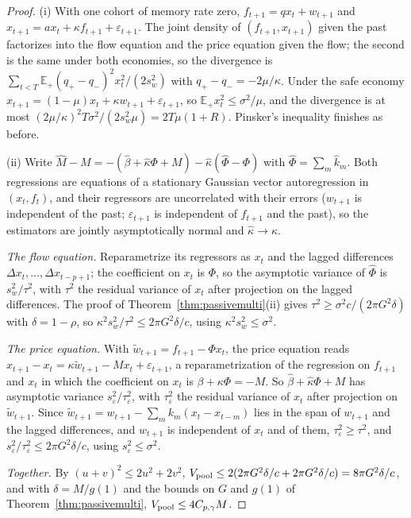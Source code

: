 \begin{proof}
(i) With one cohort of memory rate zero, $f_{t+1}=qx_t+w_{t+1}$ and $x_{t+1}=ax_t+\kappa f_{t+1}+\varepsilon_{t+1}$. The joint density of $(f_{t+1},x_{t+1})$ given the past factorizes into the flow equation and the price equation given the flow; the second is the same under both economies, so the divergence is $\sum_{t<T}\mathbb E_+(q_+-q_-)^2x_t^2/(2s_w^2)$ with $q_+-q_-=-2\mu/\kappa$. Under the safe economy $x_{t+1}=(1-\mu)x_t+\kappa w_{t+1}+\varepsilon_{t+1}$, so $\mathbb E_+x_t^2\le\sigma^2/\mu$, and the divergence is at most $(2\mu/\kappa)^2T\sigma^2/(2s_w^2\mu)=2T\mu(1+R)$. Pinsker's inequality finishes as before.

(ii) Write $\hat M-M=-(\hat\beta+\hat\kappa\Phi+M)-\hat\kappa(\hat\Phi-\Phi)$ with $\hat\Phi=\sum_m\hat k_m$. Both regressions are equations of a stationary Gaussian vector autoregression in $(x_t,f_t)$, and their regressors are uncorrelated with their errors ($w_{t+1}$ is independent of the past; $\varepsilon_{t+1}$ is independent of $f_{t+1}$ and the past), so the estimators are jointly asymptotically normal \citep{t:mannwald1943} and $\hat\kappa\to\kappa$.

\emph{The flow equation.} Reparametrize its regressors as $x_t$ and the lagged differences $\Delta x_t,\dots,\Delta x_{t-p+1}$; the coefficient on $x_t$ is $\Phi$, so the asymptotic variance of $\hat\Phi$ is $s_w^2/\tau^2$, with $\tau^2$ the residual variance of $x_t$ after projection on the lagged differences. The proof of Theorem~\ref{thm:passivemulti}(ii) gives $\tau^2\ge\sigma^2c/(2\pi G^2\delta)$ with $\delta=1-\rho$, so $\kappa^2s_w^2/\tau^2\le2\pi G^2\delta/c$, using $\kappa^2s_w^2\le\sigma^2$.

\emph{The price equation.} With $\tilde w_{t+1}=f_{t+1}-\Phi x_t$, the price equation reads $x_{t+1}-x_t=\kappa\tilde w_{t+1}-Mx_t+\varepsilon_{t+1}$, a reparametrization of the regression on $f_{t+1}$ and $x_t$ in which the coefficient on $x_t$ is $\beta+\kappa\Phi=-M$. So $\hat\beta+\hat\kappa\Phi+M$ has asymptotic variance $s_\varepsilon^2/\tau_\varepsilon^2$, with $\tau_\varepsilon^2$ the residual variance of $x_t$ after projection on $\tilde w_{t+1}$. Since $\tilde w_{t+1}=w_{t+1}-\sum_mk_m(x_t-x_{t-m})$ lies in the span of $w_{t+1}$ and the lagged differences, and $w_{t+1}$ is independent of $x_t$ and of them, $\tau_\varepsilon^2\ge\tau^2$, and $s_\varepsilon^2/\tau_\varepsilon^2\le2\pi G^2\delta/c$, using $s_\varepsilon^2\le\sigma^2$.

\emph{Together.} By $(u+v)^2\le2u^2+2v^2$, $V_{\rm pool}\le2(2\pi G^2\delta/c+2\pi G^2\delta/c)=8\pi G^2\delta/c$, and with $\delta=M/g(1)$ and the bounds on $G$ and $g(1)$ of Theorem~\ref{thm:passivemulti}, $V_{\rm pool}\le4C_{p,\gamma}M$.
\end{proof}

